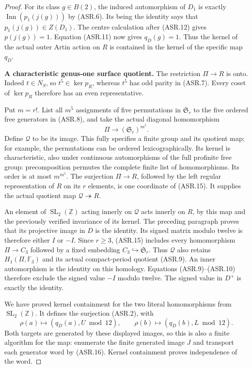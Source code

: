 \begin{proof}
For its class $g\in B(2)$, the induced automorphism of
$D_1$ is exactly $\operatorname{Inn}(p_1(j(g)))$ by
(ASR.6).  Its being the identity says that
$p_1(j(g))\in Z(D_1)$.
The centre calculation after (ASR.12) gives
$p(j(g))=1$.  Equation (ASR.11) now gives $q_D(g)=1$.
Thus the kernel of the actual outer Artin action on $R$
is contained in the kernel of the specific map $q_D$.

\par\medskip\noindent\textbf{A characteristic genus-one surface quotient.}
The restriction $\Pi\to R$ is onto.
Indeed $t\in N_S$, so $t^5\in\ker p_R$, whereas $t^5$
has odd parity in (ASR.7).  Every coset of $\ker p_R$
therefore has an even representative.

Put $m=r!$.  List all $m^5$ assignments of five permutations
in $\mathfrak S_r$ to the five ordered free generators in
(ASR.8), and take the actual diagonal homomorphism
\[
 \Pi\longrightarrow(\mathfrak S_r)^{m^5}.
                                                        \tag{ASR.15}
\]
Define $\mathcal Q$ to be its image.
This fully specifies a finite group and its quotient map;
for example, the permutations can be ordered lexicographically.
Its kernel is characteristic, also under continuous
automorphisms of the full profinite free group: precomposition
permutes the complete finite list of homomorphisms.
Its order is at most $m^{m^5}$.
The surjection $\Pi\to R$, followed by the left regular
representation of $R$ on its $r$ elements, is one coordinate
of (ASR.15).  It supplies the actual quotient map
$\mathcal Q\twoheadrightarrow R$.

An element of $\operatorname{SL}_2(\mathbb Z)$ acting
innerly on $\mathcal Q$ acts innerly on $R$, by this map
and the previously verified invariance of its kernel.
The preceding paragraph proves that its projective image
in $D$ is the identity.  Its signed matrix modulo twelve
is therefore either $I$ or $-I$.
Since $r\geq3$, (ASR.15) includes every homomorphism
$\Pi\to C_3$ followed by a fixed embedding
$C_3\hookrightarrow\mathfrak S_r$.
Thus $\mathcal Q$ also retains
$H_1(\Pi,\mathbb F_3)$ and its actual compact-period
quotient (ASR.9).  An inner automorphism is the identity
on this homology.  Equations (ASR.9)--(ASR.10) therefore
exclude the signed value $-I$ modulo twelve.
The signed value in $D^+$ is exactly the identity.

We have proved kernel containment for the two literal
homomorphisms from $\operatorname{SL}_2(\mathbb Z)$.
It defines the surjection (ASR.2), with
\[
 \rho(a)\longmapsto(q_D(a),U\bmod12),\qquad
 \rho(b)\longmapsto(q_D(b),L\bmod12).                 \tag{ASR.16}
\]
Both targets are generated by these displayed images, so
this is also a finite algorithm for the map: enumerate the
finite generated image $J$ and transport each generator
word by (ASR.16).  Kernel containment proves independence
of the word.


\end{proof}
